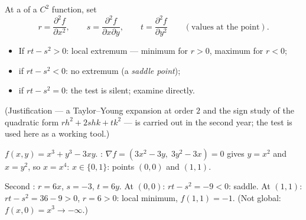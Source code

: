 \begin{method}\label{met:b1:multivar:monge}
At a  of a $C^2$ function, set
\[
r = \frac{\partial^2 f}{\partial x^2},
\qquad
s = \frac{\partial^2 f}{\partial x \partial y},
\qquad
t = \frac{\partial^2 f}{\partial y^2}
\qquad (\text{values at the point}).
\]
\begin{itemize}
  \item If $rt - s^2 > 0$: local extremum --- minimum for $r > 0$,
        maximum for $r < 0$;
  \item if $rt - s^2 < 0$: no extremum (a \emph{saddle
        point});
  \item if $rt - s^2 = 0$: the test is silent; examine directly.
\end{itemize}
(Justification --- a Taylor--Young expansion at order $2$ and the
sign study of the quadratic form $r h^2 + 2shk + tk^2$ --- is
carried out in the second year; the test is used here as a working
tool.)
\end{method}

\begin{example}\label{ex:b1:multivar:extrema}
$f(x,y) = x^3 + y^3 - 3xy$. : $\nabla f = (3x^2 -
3y,\; 3y^2 - 3x) = 0$ gives $y = x^2$ and $x = y^2$, so $x = x^4$:
$x \in \{0, 1\}$: points $(0,0)$ and $(1,1)$.

Second : $r = 6x$, $s = -3$, $t = 6y$. At $(0,0)$: $rt -
s^2 = -9 < 0$: saddle. At $(1,1)$: $rt - s^2 = 36 - 9 > 0$, $r = 6
> 0$: local minimum, $f(1,1) = -1$. (Not global: $f(x, 0) = x^3 \to
-\infty$.)
\end{example}

